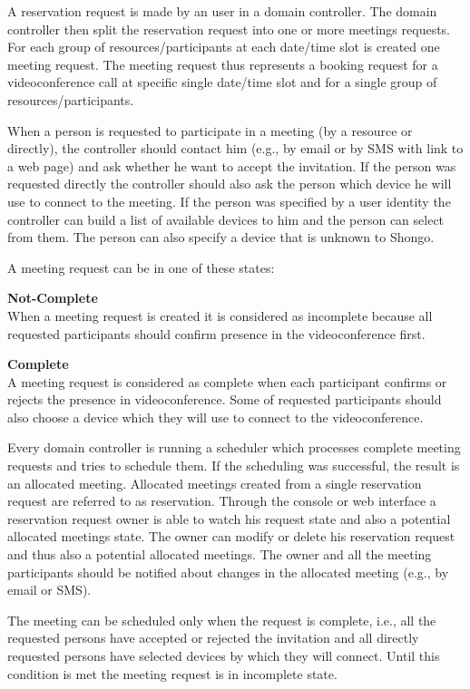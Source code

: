 A reservation request is made by an user in a domain controller. The domain controller then
split the reservation request into one or more meetings requests. For each group of resources/participants at each date/time slot is created one meeting request. The meeting request thus represents a booking request for a videoconference call at specific single date/time slot and for a single group of resources/participants.

When a person is requested to participate in a meeting (by a resource or directly), the controller should contact him (e.g., by email or by SMS with link to a web page) and ask whether he want to accept the invitation. If the person was requested directly the controller should also ask the person which device he will use to connect to the meeting. If the person was specified by a user identity the controller can build a list of available devices to him and the person can select from them. The person can also specify a device that is unknown to Shongo. 

A meeting request can be in one of these states:
\begin{compactenum}
\item \textbf{Not-Complete} \\
  When a meeting request is created it is considered as incomplete 
  because all requested participants should confirm presence in
  the videoconference first.
\item \textbf{Complete} \\
  A meeting request is considered as complete when each participant 
  confirms or rejects the presence in videoconference. Some of
  requested participants should also choose a device which they will use 
  to connect to the videoconference.
\end{compactenum}
Every domain controller is running a scheduler which processes complete meeting requests and tries to schedule them. If the scheduling was successful, the result is an allocated meeting.
Allocated meetings created from a single reservation request are referred to as reservation. Through the console or web interface a reservation request owner is able to watch his request state and also a potential allocated meetings state. The owner can modify or delete his reservation request and thus also a potential allocated meetings. The owner and all the meeting participants should be notified about changes in the allocated meeting (e.g., by email or SMS). 

The meeting can be scheduled only when the request is complete, i.e., all the requested persons have accepted or rejected the invitation and all directly requested persons have selected devices by which they will connect. Until this condition is met the meeting request is in incomplete state.

